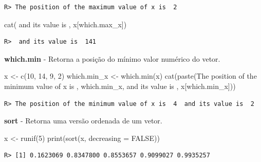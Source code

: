 \documentclass[
  11pt,
]{book}
\newenvironment{Shaded}{\begin{snugshade}}{\end{snugshade}}
\newcommand{\AttributeTok}[1]{\textcolor[rgb]{0.61,0.61,0.61}{#1}}
\newcommand{\ConstantTok}[1]{\textcolor[rgb]{0,0,0}{#1}}
\newcommand{\DecValTok}[1]{\textcolor[rgb]{0.06,0.06,0.06}{#1}}
\newcommand{\FunctionTok}[1]{\textcolor[rgb]{0,0,0}{#1}}
\newcommand{\NormalTok}[1]{#1}
\newcommand{\OtherTok}[1]{\textcolor[rgb]{0.37,0.37,0.37}{#1}}
\newcommand{\StringTok}[1]{\textcolor[rgb]{0.5,0.5,0.5}{#1}}
\begin{document}
\begin{verbatim}
R> The position of the maximum value of x is  2
\end{verbatim}

\begin{Shaded}
\begin{Highlighting}[]
\FunctionTok{cat}\NormalTok{(}\StringTok{\textquotesingle{} and its value is \textquotesingle{}}\NormalTok{, x[which.max\_x])}
\end{Highlighting}
\end{Shaded}

\begin{verbatim}
R>  and its value is  141
\end{verbatim}

\textbf{which.min} - Retorna a posição do mínimo valor numérico do vetor.

\begin{Shaded}
\begin{Highlighting}[]
\NormalTok{x }\OtherTok{\textless{}{-}} \FunctionTok{c}\NormalTok{(}\DecValTok{10}\NormalTok{, }\DecValTok{14}\NormalTok{, }\DecValTok{9}\NormalTok{, }\DecValTok{2}\NormalTok{)}
\NormalTok{which.min\_x }\OtherTok{\textless{}{-}} \FunctionTok{which.min}\NormalTok{(x)}
\FunctionTok{cat}\NormalTok{(}\FunctionTok{paste}\NormalTok{(}\StringTok{\textquotesingle{}The position of the minimum value of x is \textquotesingle{}}\NormalTok{,}
\NormalTok{          which.min\_x, }\StringTok{\textquotesingle{} and its value is \textquotesingle{}}\NormalTok{, x[which.min\_x]))}
\end{Highlighting}
\end{Shaded}

\begin{verbatim}
R> The position of the minimum value of x is  4  and its value is  2
\end{verbatim}

\textbf{sort} - Retorna uma versão ordenada de um vetor.

\begin{Shaded}
\begin{Highlighting}[]
\NormalTok{x }\OtherTok{\textless{}{-}} \FunctionTok{runif}\NormalTok{(}\DecValTok{5}\NormalTok{)}
\FunctionTok{print}\NormalTok{(}\FunctionTok{sort}\NormalTok{(x, }\AttributeTok{decreasing =} \ConstantTok{FALSE}\NormalTok{))}
\end{Highlighting}
\end{Shaded}

\begin{verbatim}
R> [1] 0.1623069 0.8347800 0.8553657 0.9099027 0.9935257
\end{verbatim}
\end{document}
